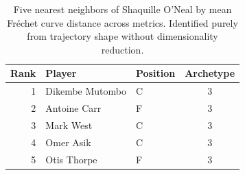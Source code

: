 \begin{table}[htbp]
  \centering\small
  \begin{tabular}{rllc}
    \toprule
    Rank & Player & Position & Archetype \\
    \midrule
    1 & Dikembe Mutombo & C & 3 \\
    2 & Antoine Carr & F & 3 \\
    3 & Mark West & C & 3 \\
    4 & Omer Asik & C & 3 \\
    5 & Otis Thorpe & F & 3 \\
    \bottomrule
  \end{tabular}
  \caption{Five nearest neighbors of Shaquille O'Neal by mean Fr\'{e}chet curve distance across metrics. Identified purely from trajectory shape without dimensionality reduction.}
  \label{tab:Shaquille_O_Neal_frechet_curve_neighbors}
\end{table}

